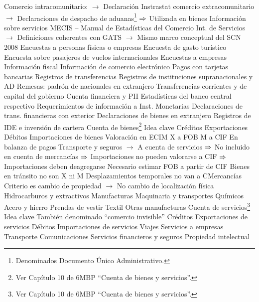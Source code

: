 \documentclass{nuevotema}
\begin{document}
\begin{esquemal}
				\4[] Comercio intracomunitario:
				\4[] $\to$ Declaración Instrastat
				\4[] comercio extracomunitario
				\4[] $\to$ Declaraciones de despacho de aduanas\footnote{Denominados Documento Único Administrativo.}
				\4[] $\then$ Utilizada en bienes
				\4 Información sobre servicios
				\4[] MECIS -- Manual de Estadísticas del Comercio Int. de Servicios
				\4[] $\to$ Definiciones coherentes con GATS
				\4[] $\to$ Mismo marco conceptual del SCN 2008
				\4[] Encuestas a personas físicas o empresas
				\4[] Encuesta de gasto turístico
				\4[] Encuesta sobre pasajeros de vuelos internacionales
				\4[] Encuestas a empresas
				\4[] Información fiscal
				\4[] Información de comercio electrónico
				\4[] Pagos con tarjetas bancarias
				\4 Registros de transferencias
				\4[] Registros de instituciones supranacionales y AD
				\4[] Remesas: padrón de nacionales en extranjero
				\4[$\then$] Transferencias corrientes y de capital del gobierno
				\4 Cuenta financiera y PII
				\4[] Estadísticas del banco central respectivo
				\4[] Requerimientos de información a Inst. Monetarias
				\4[] Declaraciones de trans. financieras con exterior
				\4[] Declaraciones de bienes en extranjero
				\4[] Registros de IDE e inversión de cartera
	\1 
		\2 Cuenta de bienes\footnote{Ver Capítulo 10 de 6MBP ``Cuenta de bienes y servicios''.}
			\3 Idea clave
				\4 Créditos
				\4[] Exportaciones
				\4 Débitos
				\4[] Importaciones de bienes
				\4 Valoración en ECIM
				\4[] X a FOB
				\4[] M a CIF
				\4 En balanza de pagos
				\4[] Transporte y seguros
				\4[] $\to$ A cuenta de servicios
				\4[] $\then$ No incluido en cuenta de mercancías
				\4[] $\then$ Importaciones no pueden valorarse a CIF
				\4[] $\then$ Importaciones deben deagregarse
				\4 Necesario estimar FOB a partir de CIF
				\4 Bienes en tránsito no son X ni M
				\4 Desplazamientos temporales no van a CMercancías
				\4[] Criterio es cambio de propiedad
				\4[] $\to$ No cambio de localización física
			\3 Hidrocarburos y extractivos
			\3 Manufacturas
				\4 Maquinaria y transportes
				\4 Químicos
				\4 Acero y hierro
				\4 Prendas de vestir
				\4 Textil
				\4 Otras manufacturas
		\2 Cuenta de servicios\footnote{Ver Capítulo 10 de 6MBP ``Cuenta de bienes y servicios''.}
			\3 Idea clave
				\4 También denominado ``comercio invisible''
				\4 Créditos
				\4[] Exportaciones de servicios
				\4 Débitos
				\4[] Importaciones de servicios
			\3 Viajes
			\3 Servicios a empresas
			\3 Transporte
			\3 Comunicaciones
			\3 Servicios financieros y seguros
			\3 Propiedad intelectual

\end{esquemal}
\end{document}
